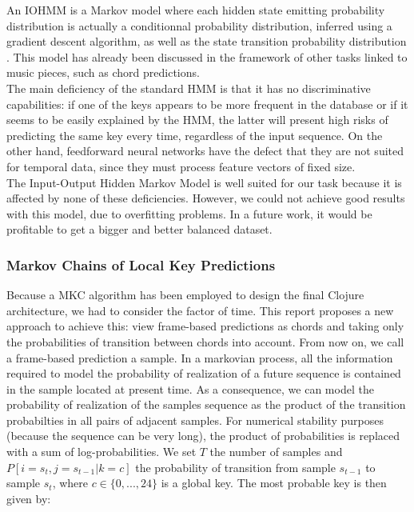 \documentclass[letterpaper]{article}
\begin{document}
An IOHMM is a Markov model where each hidden state emitting probability distribution is actually a conditionnal probability distribution, inferred using a gradient descent algorithm, as well as the state transition probability distribution \citep{YB}. This model has already been discussed in the framework of other tasks linked to  music pieces, such as chord predictions. \\

The main deficiency of the standard HMM is that it has no discriminative capabilities: if one of the keys appears to be more frequent in the database or
if it seems to be easily explained by the HMM, the latter will present high risks of predicting the same key every time, regardless of the
input sequence. On the other hand, feedforward neural networks have the defect that they are not suited for temporal data, since they must 
process feature vectors of fixed size. \\

The Input-Output Hidden Markov Model is well suited for our task because it is affected by none of these deficiencies.
However, we could not achieve good results with this model, due to overfitting problems. In a future work, it would be profitable to get a bigger and better balanced dataset.

\subsubsection{Markov Chains of Local Key Predictions}

Because a MKC algorithm has been employed to design the final Clojure architecture, we had to consider the factor of time. This report proposes a new approach to achieve this: view frame-based predictions as chords and taking only the probabilities of transition between chords into account. From now on, we call a frame-based prediction a sample. In a markovian process, all the information required to model the probability of realization of a future sequence is contained in the sample located at present time. As a consequence, we can model the probability of realization of the samples sequence as the product of the transition probabilties in all pairs of adjacent samples. For numerical stability purposes (because the sequence can be very long), the product of probabilities is replaced with a sum of log-probabilities. We set $T$ the number of samples and $P[i=s_t, j=s_{t-1} | k = c]$ the probability of transition from sample $s_{t-1}$ to sample $s_{t}$, where $c \in \{0, ..., 24\}$ is a global key. The most probable key is then given by:
\end{document}
